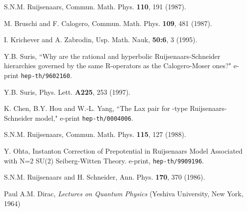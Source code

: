 \documentclass[a4paper,12pt]{article}
\begin{document}
\begin{thebibliography}{99}
  S.N.M. Ruijsenaars, Commun. Math. Phys. \textbf{110}, 191
(1987).

  M. Bruschi and F. Calogero, Commun. Math. Phys.
\textbf{109}, 481 (1987).

  I. Krichever and A. Zabrodin, Usp. Math. Nauk, \textbf{50:6}, 3
(1995).

  Y.B. Suris, ``Why are the rational and hyperbolic
Ruijsenaars-Schneider hierarchies governed by the same R-operators as the
Calogero-Moser ones?" e-print \texttt{hep-th/9602160}.

  Y.B. Suris, Phys. Lett. \textbf{A225}, 253 (1997).

	K. Chen, B.Y. Hou and W.-L. Yang, ``The Lax pair for \coordHE{}%
-type Ruijsenaars-Schneider model," e-print \texttt{hep-th/0004006}.

  S.N.M. Ruijsenaars, Commun. Math. Phys. \textbf{115},
127 (1988).

	Y. Ohta, Instanton Correction of Prepotential in
Ruijsenaars Model Associated with N=2 SU(2) Seiberg-Witten Theory. e-print,
\texttt{hep-th/9909196}.

  S.N.M. Ruijsenaars and H. Schneider, Ann. Phys.
\textbf{170}, 370 (1986).

	 Paul A.M. Dirac, \textsl{Lectures on Quantum Physics}%
(Yeshiva University, New York, 1964)
\end{thebibliography}
\end{document}
